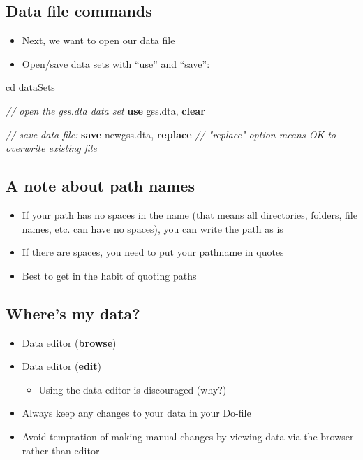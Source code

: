 \documentclass[
]{book}
\newenvironment{Shaded}{\begin{snugshade}}{\end{snugshade}}
\newcommand{\CommentTok}[1]{\textcolor[rgb]{0.56,0.35,0.01}{\textit{#1}}}
\newcommand{\KeywordTok}[1]{\textcolor[rgb]{0.13,0.29,0.53}{\textbf{#1}}}
\newcommand{\NormalTok}[1]{#1}
\providecommand{\tightlist}{%
  \setlength{\itemsep}{0pt}\setlength{\parskip}{0pt}}
\begin{document}
\hypertarget{data-file-commands}{%
\subsection{Data file commands}\label{data-file-commands}}

\begin{itemize}
\tightlist
\item
  Next, we want to open our data file
\item
  Open/save data sets with ``use'' and ``save'':
\end{itemize}

\begin{Shaded}
\begin{Highlighting}[]
\NormalTok{cd dataSets}

\CommentTok{// open the gss.dta data set}
\KeywordTok{use}\NormalTok{ gss.dta, }\KeywordTok{clear}

\CommentTok{// save data file:}
\KeywordTok{save}\NormalTok{ newgss.dta, }\KeywordTok{replace} \CommentTok{// "replace" option means OK to overwrite existing file}
\end{Highlighting}
\end{Shaded}

\hypertarget{a-note-about-path-names}{%
\subsection{A note about path names}\label{a-note-about-path-names}}

\begin{itemize}
\tightlist
\item
  If your path has no spaces in the name (that means all directories, folders, file names, etc. can have no spaces), you can write the path as is
\item
  If there are spaces, you need to put your pathname in quotes
\item
  Best to get in the habit of quoting paths
\end{itemize}

\hypertarget{wheres-my-data}{%
\subsection{Where's my data?}\label{wheres-my-data}}

\begin{itemize}
\tightlist
\item
  Data editor (\textbf{browse})
\item
  Data editor (\textbf{edit})

  \begin{itemize}
  \tightlist
  \item
    Using the data editor is discouraged (why?)
  \end{itemize}
\item
  Always keep any changes to your data in your Do-file
\item
  Avoid temptation of making manual changes by viewing data via the browser rather than editor
\end{itemize}
\end{document}
